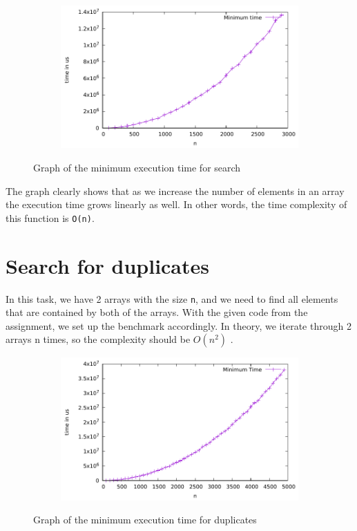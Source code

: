 \documentclass[a4paper,11pt]{article}
\begin{document}
\begin{figure}[H]
  \centering
  \begin{subfigure}[b]{.5\textwidth}
    \centering
    \includegraphics[width=\textwidth]{./search/data} %
  \end{subfigure}
  \caption{Graph of the minimum execution time for search}
  \label{fig:graph_4}
\end{figure}
The graph clearly shows that as we increase the number of elements in an array the execution time grows linearly as well.
In other words, the time complexity of this function is {\tt O(n)}.

\section*{Search for duplicates}

In this task, we have 2 arrays with the size {\tt n}, and we need to find all elements that are contained by both of the arrays.
With the given code from the assignment, we set up the benchmark accordingly.
In theory, we iterate through 2 arrays n times, so the complexity should be $O(n^2)$ .

\begin{figure}[H]
  \centering
  \begin{subfigure}[b]{.5\textwidth}
    \centering
    \includegraphics[width=\textwidth]{./duplicates/data} %
  \end{subfigure}
  \caption{Graph of the minimum execution time for duplicates}
  \label{fig:graph_5}
\end{figure}
\end{document}
